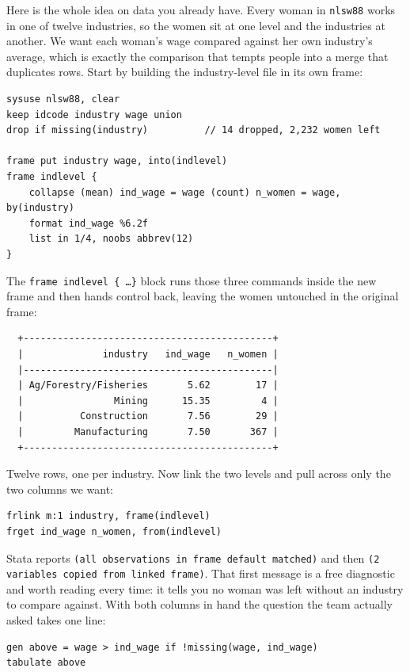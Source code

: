 Here is the whole idea on data you already have. Every woman in \texttt{nlsw88} works in one of twelve industries, so the women sit at one level and the industries at another. We want each woman's wage compared against her own industry's average, which is exactly the comparison that tempts people into a merge that duplicates rows. Start by building the industry-level file in its own frame:
\par
{\footnotesize
\begin{verbatim}
sysuse nlsw88, clear
keep idcode industry wage union
drop if missing(industry)          // 14 dropped, 2,232 women left

frame put industry wage, into(indlevel)
frame indlevel {
    collapse (mean) ind_wage = wage (count) n_women = wage, by(industry)
    format ind_wage %6.2f
    list in 1/4, noobs abbrev(12)
}
\end{verbatim}
}
The \texttt{frame indlevel \{ \dots \}} block runs those three commands inside the new frame and then hands control back, leaving the women untouched in the original frame:
\par
{\footnotesize
\begin{verbatim}
  +--------------------------------------------+
  |              industry   ind_wage   n_women |
  |--------------------------------------------|
  | Ag/Forestry/Fisheries       5.62        17 |
  |                Mining      15.35         4 |
  |          Construction       7.56        29 |
  |         Manufacturing       7.50       367 |
  +--------------------------------------------+
\end{verbatim}
}
Twelve rows, one per industry. Now link the two levels and pull across only the two columns we want:
\par
{\footnotesize
\begin{verbatim}
frlink m:1 industry, frame(indlevel)
frget ind_wage n_women, from(indlevel)
\end{verbatim}
}
Stata reports \texttt{(all observations in frame default matched)} and then \texttt{(2 variables copied from linked frame)}. That first message is a free diagnostic and worth reading every time: it tells you no woman was left without an industry to compare against. With both columns in hand the question the team actually asked takes one line:
\par
{\footnotesize
\begin{verbatim}
gen above = wage > ind_wage if !missing(wage, ind_wage)
tabulate above
\end{verbatim}
}
